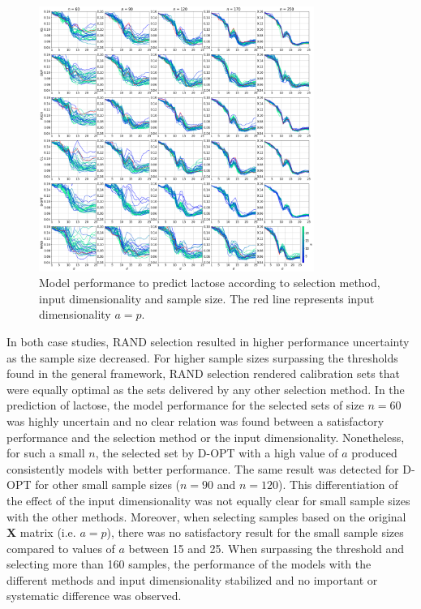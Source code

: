 \documentclass[journal=ancham,manuscript=article]{achemso}
\begin{document}
\begin{figure}[b]
\includegraphics[width=0.8\textwidth]{manuscript/figures/d01_milk_model_performance.png}
\centering
\caption{Model performance to predict lactose according to selection method, input dimensionality and sample size. The red line represents input dimensionality $a=p$.}
\label{fig_d01_milk_model_performance}
\end{figure}

In both case studies, RAND selection resulted in higher performance uncertainty as the sample size decreased. For higher sample sizes surpassing the thresholds found in the general framework, RAND selection rendered calibration sets that were equally optimal as the sets delivered by any other selection method. In the prediction of lactose, the model performance for the selected sets of size $n=60$ was highly uncertain and no clear relation was found between a satisfactory performance and the selection method or the input dimensionality. Nonetheless, for such a small $n$, the selected set by D-OPT with a high value of $a$ produced consistently models with better performance. The same result was detected for D-OPT for other small sample sizes ($n=90$ and $n=120$). This differentiation of the effect of the input dimensionality was not equally clear for small sample sizes with the other methods. Moreover, when selecting samples based on the original $\mathbf{X}$ matrix (i.e. $a=p$), there was no satisfactory result for the small sample sizes compared to values of $a$ between 15 and 25. When surpassing the threshold and selecting more than 160 samples, the performance of the models with the different methods and input dimensionality stabilized and no important or systematic difference was observed.
\end{document}
